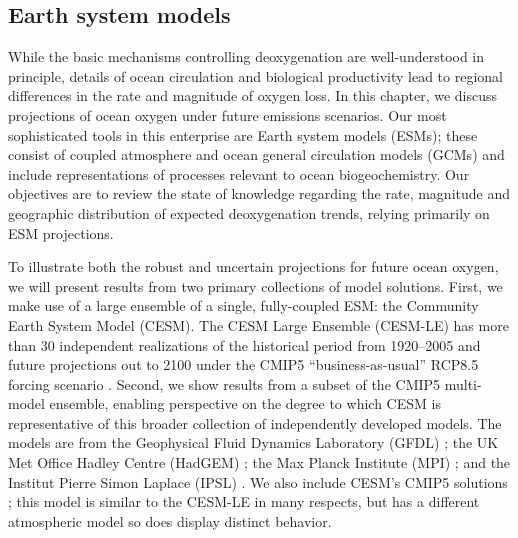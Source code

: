 \documentclass[draft,linenumbers]{report_chapter}
\begin{document}
\subsection{Earth system models}

While the basic mechanisms controlling deoxygenation are well-understood in principle, details of ocean circulation and biological productivity lead to regional differences in the rate and magnitude of oxygen loss.
In this chapter, we discuss projections of ocean oxygen under future emissions scenarios.
Our most sophisticated tools in this enterprise are Earth system models (ESMs); these consist of coupled atmosphere and ocean general circulation models (GCMs) and include representations of processes relevant to ocean biogeochemistry.
Our objectives are to review the state of knowledge regarding the rate, magnitude and geographic distribution of expected deoxygenation trends, relying primarily on ESM projections.

To illustrate both the robust and uncertain projections for future ocean oxygen, we will present results from two primary collections of model solutions.
First, we make use of a large ensemble of a single, fully-coupled ESM: the Community Earth System Model (CESM).
The CESM Large Ensemble (CESM-LE) has more than 30 independent realizations of the historical period from 1920--2005 and future projections out to 2100 under  the CMIP5 ``business-as-usual'' RCP8.5 forcing scenario \citep{Kay-Deser-etal-2015}.
Second, we show results from a subset of the CMIP5 multi-model ensemble, enabling perspective on the degree to which CESM is representative of this broader collection of independently developed models.
The models are from the Geophysical Fluid Dynamics Laboratory (GFDL) \citep{Dunne-John-etal-2012a,Dunne-John-etal-2013b}; the UK Met Office Hadley Centre (HadGEM) \citep{Collins-Bellouin-etal-2011,HadGEM2-Development-Team-2011}; the Max Planck Institute (MPI) \citep{Giorgetta-Jungclaus-etal-2013}; and the Institut Pierre Simon Laplace (IPSL) \citep{Dufresne-Foujols-etal-2013}.
We also include CESM's CMIP5 solutions \citep{Hurrell-Holland-etal-2013}; this model is similar to the CESM-LE in many respects, but has a different atmospheric model so does display distinct behavior.
\end{document}
